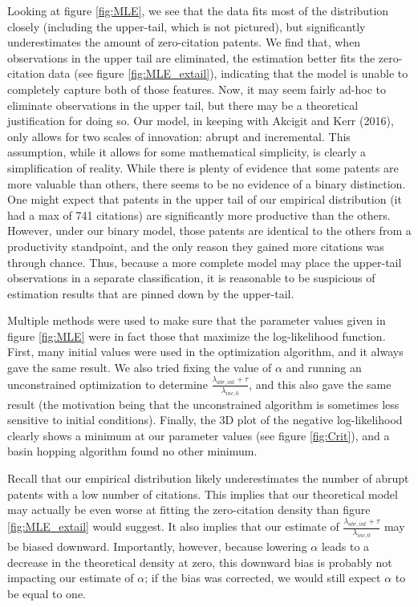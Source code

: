 \documentclass[letterpaper,12pt]{article}
\theoremstyle{definition}
\begin{document}
Looking at figure \ref{fig:MLE}, we see that the data fits most of the distribution closely (including the upper-tail, which is not pictured), but significantly underestimates the amount of zero-citation patents. We find that, when observations in the upper tail are eliminated, the estimation better fits the zero-citation data (see figure \ref{fig:MLE_extail}), indicating that the model is unable to completely capture both of those features. Now, it may seem fairly ad-hoc to eliminate observations in the upper tail, but there may be a theoretical justification for doing so. Our model, in keeping with Akcigit and Kerr (2016), only allows for two scales of innovation: abrupt and incremental. This assumption, while it allows for some mathematical simplicity, is clearly a simplification of reality. While there is plenty of evidence that some patents are more valuable than others, there seems to be no evidence of a binary distinction. One might expect that patents in the upper tail of our empirical distribution (it had a max of 741 citations) are significantly more productive than the others. However, under our binary model, those patents are identical to the others from a productivity standpoint, and the only reason they gained more citations was through chance. Thus, because a more complete model may place the upper-tail observations in a separate classification, it is reasonable to be suspicious of estimation results that are pinned down by the upper-tail.

Multiple methods were used to make sure that the parameter values given in figure \ref{fig:MLE} were in fact those that maximize the log-likelihood function. First, many initial values were used in the optimization algorithm, and it always gave the same result. We also tried fixing the value of $\alpha$ and running an unconstrained optimization to determine $\frac{\lambda_{abr, int} + \tau}{\lambda_{inc,0}}$, and this also gave the same result (the motivation being that the unconstrained algorithm is sometimes less sensitive to initial conditions). Finally, the 3D plot of the negative log-likelihood clearly shows a minimum at our parameter values (see figure \ref{fig:Crit}), and a basin hopping algorithm found no other minimum.

Recall that our empirical distribution likely underestimates the number of abrupt patents with a low number of citations. This implies that our theoretical model may actually be even worse at fitting the zero-citation density than figure \ref{fig:MLE_extail} would suggest. It also implies that our estimate of $\frac{\lambda_{abr, int} + \tau}{\lambda_{inc,0}}$ may be biased downward. Importantly, however, because lowering $\alpha$ leads to a decrease in the theoretical density at zero, this downward bias is probably not impacting our estimate of $\alpha$; if the bias was corrected, we would still expect $\alpha$ to be equal to one.
\end{document}
